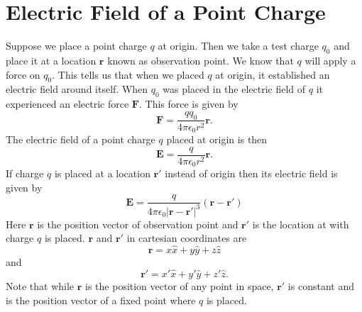 \documentclass[12pt,a4paper]{article}
\begin{document}
\section{Electric Field of a Point Charge}
Suppose we place a point charge $q$ at origin. Then we take a test charge $q_0$ and place it at a location $\textbf{r}$ known as observation point. We know that $q$ will apply a force on $q_0$. This tells us that when we placed $q$ at origin, it established an electric field around itself. When $q_0$ was placed in the electric field of $q$ it experienced an electric force $\textbf{F}$. This force is given by
\begin{equation}
\textbf{F}=\dfrac{qq_0}{4\pi\epsilon_0 r^2}\textbf{r}.
\end{equation}
The electric field of a point charge $q$ placed at origin is then
\begin{equation}
\textbf{E}=\dfrac{q}{4\pi\epsilon_0 r^2}\textbf{r}.
\end{equation}
If charge $q$ is placed at a location $\textbf{r}'$ instead of origin then its electric field is given by
\begin{equation}
\textbf{E}=\dfrac{q}{4\pi\epsilon_0 |\textbf{r}-\textbf{r}'|^3}(\textbf{r}-\textbf{r}')
\end{equation}
Here $\textbf{r}$ is the position vector of observation point and $\textbf{r}'$ is the location at with charge $q$ is placed. $\textbf{r}$ and $\textbf{r}'$ in cartesian coordinates are
\begin{equation}
\textbf{r}=x\hat x+y\hat y+z\hat z
\end{equation}
and
\begin{equation}
\textbf{r}'=x'\hat x+y'\hat y+z'\hat z.
\end{equation}
Note that while $\textbf{r}$ is the position vector of any point in space, $\textbf{r}'$ is constant and is the position vector of a fixed point where $q$ is placed.
\end{document}
